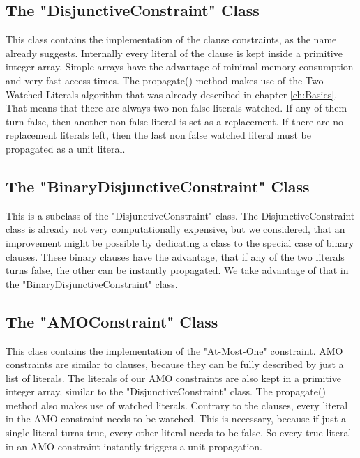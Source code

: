 \subsection{The "DisjunctiveConstraint" Class}

This class contains the implementation of the clause constraints, as the name already suggests. Internally every literal of the clause is kept inside a primitive integer array. Simple arrays have the advantage of minimal memory consumption and very fast access times. The propagate() method makes use of the Two-Watched-Literals algorithm that was already described in chapter \ref{ch:Basics}. That means that there are always two non false literals watched. If any of them turn false, then another non false literal is set as a replacement. If there are no replacement literals left, then the last non false watched literal must be propagated as a unit literal.

\subsection{The "BinaryDisjunctiveConstraint" Class}

This is a subclass of the "DisjunctiveConstraint" class. The DisjunctiveConstraint class is already not very computationally expensive, but we considered, that an improvement might be possible by dedicating a class to the special case of binary clauses. These binary clauses have the advantage, that if any of the two literals turns false, the other can be instantly propagated. We take advantage of that in the "BinaryDisjunctiveConstraint" class.

\subsection{The "AMOConstraint" Class}

This class contains the implementation of the "At-Most-One" constraint. AMO constraints are similar to clauses, because they can be fully described by just a list of literals.
The literals of our AMO constraints are also kept in a primitive integer array, similar to the "DisjunctiveConstraint" class. The propagate() method also makes use of watched literals. Contrary to the clauses, every literal in the AMO constraint needs to be watched. This is necessary, because if just a single literal turns true, every other literal needs to be false. So every true literal in an AMO constraint instantly triggers a unit propagation.


